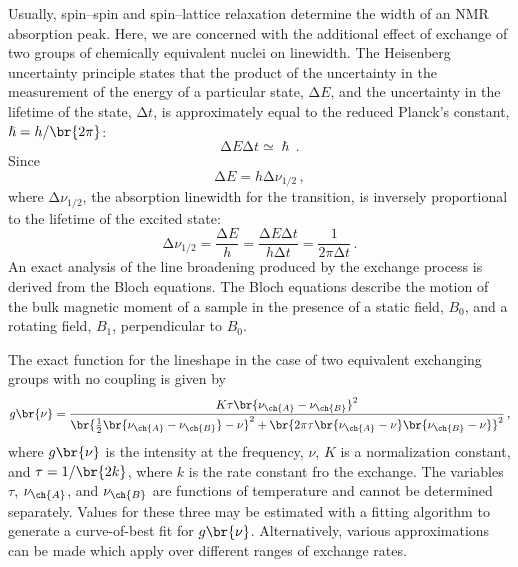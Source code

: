 \documentclass[nobib,nofonts,nols,nohyper]{tufte-handout}
\begin{document}
Usually, spin--spin and spin--lattice relaxation determine the width of an NMR absorption peak.\autocite{levitt08a}
Here, we are concerned with the additional effect of exchange of two groups of chemically equivalent nuclei on linewidth.
The Heisenberg uncertainty principle states that the product of the uncertainty in the measurement of the energy of a particular state, \( \increment E \), and the uncertainty in the lifetime of the state, \( \increment t \), is approximately equal to the reduced Planck's constant, \( \hslash = h/\br{2\pi} \):
\begin{equation}
  \increment E \increment t \simeq \hslash \, .
  \label{eq:heisenberg}
\end{equation}
Since 
\begin{equation}
  \increment E = h \increment \nu_{1/2} \, ,
  \label{eq:width1}
\end{equation}
where \( \increment \nu_{1/2} \), the absorption linewidth for the transition, is inversely proportional to the lifetime of the excited state:
\begin{equation}
  \increment \nu_{1/2} 
    = \frac{\increment E}{h} 
    = \frac{\increment E \increment t}{h \increment t} 
    = \frac{1}{2 \pi \increment t} \, .
  \label{eq:width2}
\end{equation}
An exact analysis of the line broadening produced by the exchange process is derived from the Bloch equations.\autocite{bovey69}
The Bloch equations describe the motion of the bulk magnetic moment of a sample in the presence of a static field, \( B_0 \), and a rotating field, \( B_1 \), perpendicular to \( B_0 \). 

The exact function for the lineshape\autocite{carrington67} in the case of two equivalent exchanging groups with no coupling is given by 
\begin{equation}
  g\br{\nu} = \frac{K \tau \br{\nu_\ch{A} - \nu_{\ch{B}}}^2}{
  \br{\frac{1}{2}\br{\nu_{\ch{A}} - \nu_{\ch{B}}} - \nu}^2 + \br{2 \pi \tau \br{\nu_{\ch{A}} - \nu} \br{\nu_{\ch{B}} - \nu}}^2} \, ,
  \label{eq:lineshape}
\end{equation}
where \( g\br{\nu} \) is the intensity at the frequency, \( \nu \), \( K \) is a normalization constant, and \( \tau = 1/\br{2k} \), where \( k \) is the rate constant fro the exchange. 
The variables \( \tau \), \( \nu_\ch{A} \), and \( \nu_\ch{B} \) are functions of temperature and cannot be determined separately. 
Values for these three may be estimated with a fitting algorithm to generate a curve-of-best fit for \( g\br{\nu} \). 
Alternatively, various approximations can be made which apply over different ranges of exchange rates. 
\end{document}
